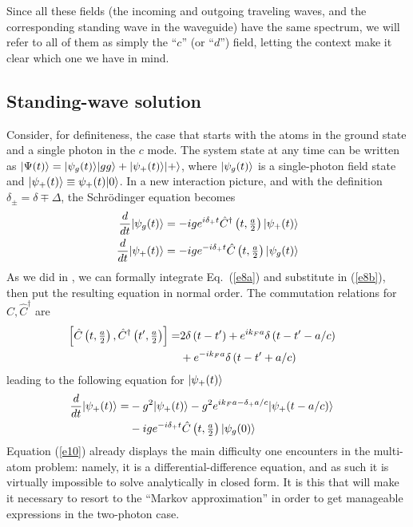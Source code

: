 \documentclass[aps,pra,twocolumn,floatfix,superscriptaddress]{revtex4}
\begin{document}
Since all these fields (the incoming and outgoing traveling waves, and the corresponding standing wave in the waveguide) have the same spectrum, we will refer to all of them as simply the ``$c$'' (or ``$d$'') field, letting the context make it clear which one we have in mind. 


\subsection{Standing-wave solution}


Consider, for definiteness, the case that starts with the atoms in the ground state and a single photon in the $c$ mode.  The  system state at any time can be written as $|\Psi(t)\rangle = |\psi_{g}(t)\rangle|gg\rangle + |\psi_{+}(t)\rangle|+\rangle$, where $|\psi_{g}(t)\rangle$ is a single-photon field state and $|\psi_{+}(t)\rangle \equiv \psi_+(t)|0\rangle$.  In a new interaction picture, and with the definition $\delta_\pm = \delta \mp \Delta$, the Schr\" odinger equation becomes
\begin{subequations}
\begin{align}
\frac{d}{dt}|\psi_{g}(t)\rangle &= -ig e^{i\delta_+ t}\hat C^\dagger\left(t,\tfrac{a}{2}\right) |\psi_{+}(t)\rangle \label{e8a} \\
\frac{d}{dt}|\psi_{+}(t)\rangle &= -ig e^{-i\delta_+ t}\hat C\left(t,\tfrac{a}{2}\right)  |\psi_{g}(t)\rangle \label{e8b} 
\end{align}
\label{e8}
\end{subequations}
As we did in \cite{us}, we can formally integrate Eq.~(\ref{e8a}) and substitute in (\ref{e8b}), then put the resulting equation in normal order. The commutation relations for $\hat C,\hat C^\dagger$ are
\begin{align}
\left[\hat C\left(t,\tfrac{a}{2}\right),\hat C^\dagger\left(t^\prime,\tfrac{a}{2}\right)\right] = &2\delta\left(t-t^\prime\right) +e^{i k_F a} \delta\left(t-t^\prime-a/c\right) \cr
&+e^{-i k_F a}\delta\left(t-t^\prime+a/c\right) 
\label{e9}
\end{align}
leading to the following equation for $|\psi_{+}(t)\rangle$
\begin{align}
\frac{d}{dt}|\psi_{+}(t)\rangle = &-g^2 |\psi_{+}(t)\rangle - g^2 e^{ik_F a-\delta_+ a/c} |\psi_{+}(t-a/c)\rangle \cr
&-ig e^{-i\delta_+ t} \hat C\left(t,\tfrac{a}{2}\right)|\psi_{g}(0)\rangle
\label{e10}
\end{align}
Equation (\ref{e10}) already displays the main difficulty one encounters in the multi-atom problem: namely, it is a differential-difference equation, and as such it is virtually impossible to solve analytically in closed form.  It is this that will make it necessary to resort to the ``Markov approximation'' in order to get manageable expressions in the two-photon case.
\end{document}
